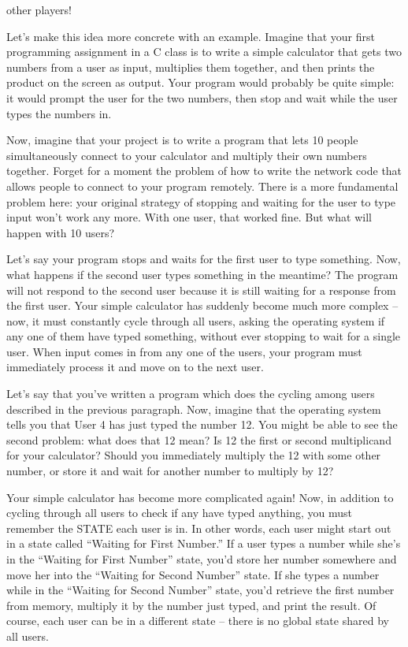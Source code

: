 \documentclass[11pt]{article}
\begin{document}
other players!
\par
Let's make this idea more concrete with an example.  Imagine that your first programming assignment in a C class is to write a simple calculator that gets two numbers from a user as input, multiplies them together, and then prints the product on the screen as output.  Your program would probably be quite simple: it would prompt the user for the two numbers, then stop and wait while the user types the numbers in.
\par
Now, imagine that your project is to write a program that lets 10 people simultaneously connect to your calculator and multiply their own numbers together.  Forget for a moment the problem of how to write the network code that allows people to connect to your program remotely.  There is a more
fundamental problem here: your original strategy of stopping and waiting for the user to type input won't work any more.  With one user, that worked fine. But what will happen with 10 users?
\par
Let's say your program stops and waits for the first user to type something.  Now, what happens if the second user types something in the meantime?  The program will not respond to the second user because it is still waiting for a response from the first user.  Your simple calculator has
suddenly become much more complex -- now, it must constantly cycle through all users, asking the operating system if any one of them have typed something, without ever stopping to wait for a single user.  When input comes in from any one of the users, your program must immediately process it and move on to the next user.
\par
Let's say that you've written a program which does the cycling among users described in the previous paragraph.  Now, imagine that the operating system tells you that User 4 has just typed the number 12.  You might be able to see the second problem: what does that 12 mean?  Is 12 the first or second multiplicand for your calculator?  Should you immediately multiply the 12 with some other number, or store it and wait for another number to multiply by 12?
\par
Your simple calculator has become more complicated again!  Now, in addition to cycling through all users to check if any have typed anything, you must remember the STATE each user is in.  In other words, each user might start out in a state called ``Waiting for First Number.''  If a user types a
number while she's in the ``Waiting for First Number'' state, you'd store her number somewhere and move her into the ``Waiting for Second Number'' state.  If she types a number while in the ``Waiting for Second Number'' state, you'd retrieve the first number from memory, multiply it by the number just typed, and print the result.  Of course, each user can be in a different state -- there is no global state shared by all users.
\end{document}
